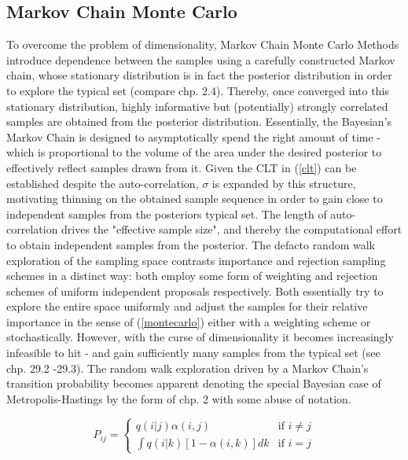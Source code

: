 \documentclass[11pt]{article}
\begin{document}
        \subsection{Markov Chain Monte Carlo}
        To overcome the problem of dimensionality, Markov Chain Monte Carlo Methods introduce dependence between the samples using a carefully constructed Markov chain, whose stationary distribution is in fact the posterior distribution in order to explore the typical set (compare \cite{betancourt2017conceptual} chp. 2.4). Thereby, once converged into this stationary distribution, highly informative but (potentially) strongly correlated samples are obtained from the posterior distribution.
        Essentially, the Bayesian's Markov Chain is designed to asymptotically spend the right amount of time - which is proportional to the volume of the area under the desired posterior to effectively reflect samples drawn from it. Given the CLT in (\ref{clt}) can be established despite the auto-correlation, $\sigma$ is expanded by this structure, motivating thinning on the obtained sample sequence in order to gain close to independent samples from the posteriors typical set. The length of auto-correlation drives the "effective sample size", and thereby the computational effort to obtain independent samples from the posterior.
        The defacto random walk exploration of the sampling space contrasts importance and rejection sampling schemes in a distinct way: both employ some form of weighting and rejection schemes of uniform independent proposals respectively. Both essentially try to explore the entire space uniformly and adjust the samples for their relative importance in the sense of (\ref{montecarlo}) either with a weighting scheme or stochastically. However, with the curse of dimensionality it becomes increasingly infeasible to hit - and gain sufficiently many samples from the typical set (see \cite{mackay2003information} chp. 29.2 -29.3).
        The random walk exploration driven by a Markov Chain's transition probability becomes apparent denoting the special Bayesian case of Metropolis-Hastings \cite{} by the form of \cite{roberts1999note} chp. 2 with some abuse of notation.

        \begin{equation}
            P_{ij} = \begin{cases}
                        q(i|j)\alpha(i,j) & \text{if } i \neq j \\
                        \int q(i|k)[1-\alpha(i,k)] dk & \text{if } i = j
            \end{cases}
        \end{equation}
\end{document}
